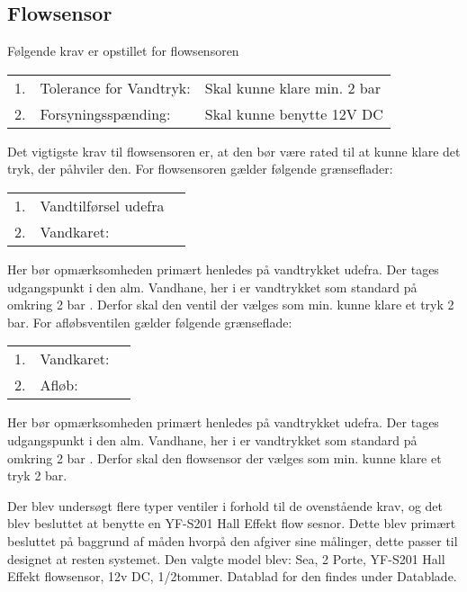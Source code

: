 \subsection{Flowsensor}
Følgende krav er opstillet for flowsensoren 

\begin{table}[h]
	\begin{tabular}{ l l l }
		1. 	& Tolerance for Vandtryk:   	& Skal kunne klare min. 2 bar \\
		2. 	& Forsyningsspænding: 			& Skal kunne benytte 12V DC \\
	\end{tabular}
\end{table}

Det vigtigste krav til flowsensoren er, at den bør være rated til at kunne klare det tryk, der påhviler den. 
For flowsensoren gælder følgende grænseflader: 

\begin{table}[h]
	\begin{tabular}{ l l l }
		1. 	& Vandtilførsel udefra   		& \\
		2. 	& Vandkaret: 					&
	\end{tabular}
\end{table}

Her bør opmærksomheden primært henledes på vandtrykket udefra. 
Der tages udgangspunkt i den alm. Vandhane, her i er vandtrykket som standard på omkring 2 bar . 
Derfor skal den ventil der vælges som min. kunne klare et tryk 2 bar. 
For afløbsventilen gælder følgende grænseflade: 

\begin{table}[h]
	\begin{tabular}{ l l l }
		1. 	& Vandkaret:  					& \\
		2. 	& Afløb: 						&
	\end{tabular}
\end{table}

Her bør opmærksomheden primært henledes på vandtrykket udefra. 
Der tages udgangspunkt i den alm. Vandhane, her i er vandtrykket som standard på omkring 2 bar . 
Derfor skal den flowsensor der vælges som min. kunne klare et tryk 2 bar. 

Der blev undersøgt flere typer ventiler i forhold til de ovenstående krav, og det blev besluttet at benytte en YF-S201 Hall Effekt flow sesnor. Dette blev primært besluttet på baggrund af måden hvorpå den afgiver sine målinger, dette passer til designet at resten systemet.  
Den valgte model blev: 
Sea, 2 Porte, YF-S201 Hall Effekt flowsensor, 12v DC,  1/2tommer.
Datablad for den findes under Datablade. 